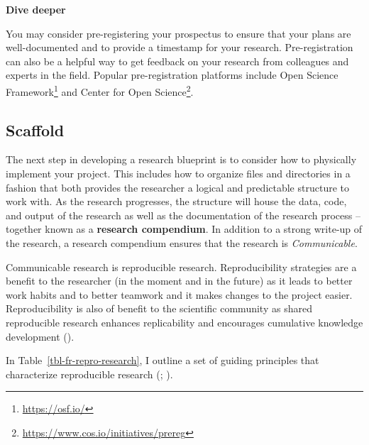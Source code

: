 \documentclass[
  letterpaper,
]{latex/krantz}
\theoremstyle{definition}
\theoremstyle{remark}
\DeclareRobustCommand{\href}[2]{#2\footnote{\url{#1}}}
\begin{document}
\begin{tcolorbox}[enhanced jigsaw, breakable, leftrule=.75mm, arc=.35mm, colframe=quarto-callout-color-frame, colback=white, left=2mm, bottomrule=.15mm, rightrule=.15mm, toprule=.15mm, opacityback=0]

\textbf{ Dive deeper}

You may consider pre-registering your prospectus to ensure that your
plans are well-documented and to provide a timestamp for your research.
Pre-registration can also be a helpful way to get feedback on your
research from colleagues and experts in the field. Popular
pre-registration platforms include \href{https://osf.io/}{Open Science
Framework} and \href{https://www.cos.io/initiatives/prereg}{Center for
Open Science}.

\end{tcolorbox}

\subsection{Scaffold}\label{sec-fr-scaffold}

The next step in developing a research blueprint is to consider how to
physically implement your project. This includes how to organize files
and directories in a fashion that both provides the researcher a logical
and predictable structure to work with. As the research progresses, the
structure will house the data, code, and output of the research as well
as the documentation of the research process --together known as a
\textbf{research compendium}. In addition to a strong write-up of the
research, a research compendium ensures that the research is
\emph{Communicable}.

Communicable research is reproducible research. Reproducibility
strategies are a benefit to the researcher (in the moment and in the
future) as it leads to better work habits and to better teamwork and it
makes changes to the project easier. Reproducibility is also of benefit
to the scientific community as shared reproducible research enhances
replicability and encourages cumulative knowledge development
().

In Table~\ref{tbl-fr-repro-research}, I outline a set of guiding
principles that characterize reproducible research
(;
).
\end{document}
